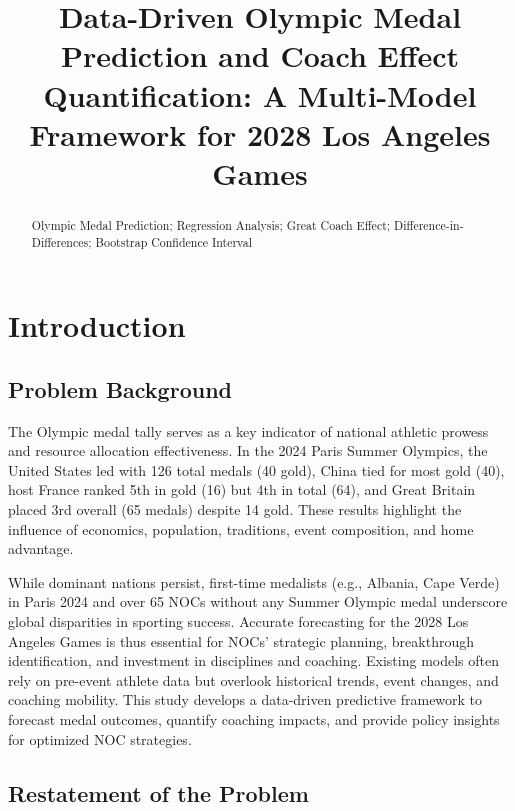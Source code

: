 \documentclass{mcmthesis}
\title{Data-Driven Olympic Medal Prediction and Coach Effect Quantification: A Multi-Model Framework for 2028 Los Angeles Games}
\begin{document}
\begin{abstract}
\lipsum[1]

\begin{keywords}
Olympic Medal Prediction; Regression Analysis; Great Coach Effect; Difference-in-Differences; Bootstrap Confidence Interval
\end{keywords}
\end{abstract}
\maketitle
 \tableofcontents
 \newpage



\section{Introduction}

\subsection{Problem Background}
The Olympic medal tally serves as a key indicator of national athletic prowess and resource allocation effectiveness. In the 2024 Paris Summer Olympics, the United States led with 126 total medals (40 gold), China tied for most gold (40), host France ranked 5th in gold (16) but 4th in total (64), and Great Britain placed 3rd overall (65 medals) despite 14 gold. These results highlight the influence of economics, population, traditions, event composition, and home advantage.

While dominant nations persist, first-time medalists (e.g., Albania, Cape Verde) in Paris 2024 and over 65 NOCs without any Summer Olympic medal underscore global disparities in sporting success. Accurate forecasting for the 2028 Los Angeles Games is thus essential for NOCs' strategic planning, breakthrough identification, and investment in disciplines and coaching. Existing models often rely on pre-event athlete data but overlook historical trends, event changes, and coaching mobility. This study develops a data-driven predictive framework to forecast medal outcomes, quantify coaching impacts, and provide policy insights for optimized NOC strategies.

\subsection{Restatement of the Problem}
\end{document}
